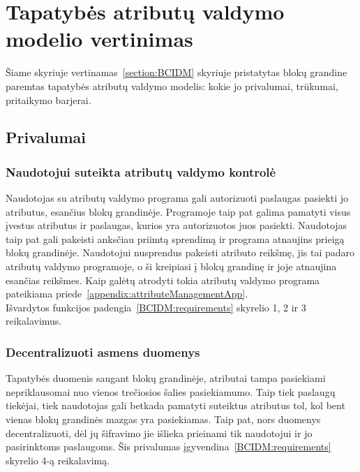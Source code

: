 \section{Tapatybės atributų valdymo modelio vertinimas} \label{section:blockchainIDMevaluation}

Šiame skyriuje vertinamas\hypertarget{section:BCIDM}{~\ref{section:BCIDM}} skyriuje pristatytas blokų grandine paremtas tapatybės atributų
valdymo modelis: kokie jo privalumai, trūkumai, pritaikymo barjerai.

\subsection{Privalumai}

\subsubsection{Naudotojui suteikta atributų valdymo kontrolė}

Naudotojas su atributų valdymo programa gali autorizuoti paslaugas pasiekti jo atributus, esančius blokų grandinėje. Programoje
taip pat galima pamatyti visus įvestus atributus ir paslaugas, kurios yra autorizuotos juos pasiekti. Naudotojas taip pat
gali pakeisti anksčiau priimtą sprendimą ir programa atnaujins prieigą blokų grandinėje. Naudotojui nusprendus pakeisti
atributo reikšmę, jis tai padaro atributų valdymo programoje, o ši kreipiasi į blokų grandinę ir joje atnaujina esančias reikšmes. Kaip
galėtų atrodyti tokia atributų valdymo programa pateikiama priede\hypertarget{appendix:attributeManagementApp}{~\ref{appendix:attributeManagementApp}}.\\
Išvardytos funkcijos padengia\hypertarget{BCIDM:requirements}{~\ref{BCIDM:requirements}} skyrelio 1, 2 ir 3 reikalavimus.

\subsubsection{Decentralizuoti asmens duomenys}

Tapatybės duomenis saugant blokų grandinėje, atributai tampa pasiekiami nepriklausomai nuo vienos trečiosios šalies pasiekiamumo.
Taip tiek paslaugų tiekėjai, tiek naudotojas gali betkada pamatyti suteiktus atributus tol, kol bent vienas blokų grandinės mazgas
yra pasiekiamas. Taip pat, nors duomenys decentralizuoti, dėl jų šifravimo jie išlieka prieinami tik naudotojui ir jo pasirinktoms
paslaugoms.
Šis privalumas įgyvendina\hypertarget{BCIDM:requirements}{~\ref{BCIDM:requirements}} skyrelio 4-ą reikalavimą.

